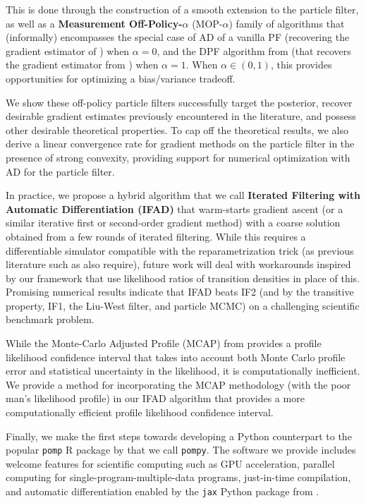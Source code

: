 \documentclass{article}
\begin{document}
This is done through the construction of a smooth extension to the particle filter, as well as a \textbf{Measurement Off-Policy-$\alpha$} (MOP-$\alpha$) family of algorithms that (informally) encompasses the special case of AD of a vanilla PF (recovering the gradient estimator of \citet{blei2018vsmc}) when $\alpha=0$, and the DPF algorithm from \citet{scibior2021dpf} (that recovers the gradient estimator from \citet{poyiadjis11}) when $\alpha=1$. When $\alpha \in (0,1)$, this provides opportunities for optimizing a bias/variance tradeoff. 

We show these off-policy particle filters successfully target the posterior, recover desirable gradient estimates previously encountered in the literature, and possess other desirable theoretical properties. To cap off the theoretical results, we also derive a linear convergence rate for gradient methods on the particle filter in the presence of strong convexity, providing support for numerical optimization with AD for the particle filter. 

In practice, we propose a hybrid algorithm that we call \textbf{Iterated Filtering with Automatic Differentiation (IFAD)} that warm-starts gradient ascent (or a similar iterative first or second-order gradient method) with a coarse solution obtained from a few rounds of iterated filtering. While this requires a differentiable simulator compatible with the reparametrization trick (as previous literature such as \citet{corenflos21} also require), future work will deal with workarounds inspired by our framework that use likelihood ratios of transition densities in place of this. Promising numerical results indicate that IFAD beats IF2 (and by the transitive property, IF1, the Liu-West filter, and particle MCMC) on a challenging scientific benchmark problem.

While the Monte-Carlo Adjusted Profile (MCAP) from \citet{Ionides_mcap} provides a profile likelihood confidence interval that takes into account both Monte Carlo profile error and statistical uncertainty in the likelihood, it is computationally inefficient.  We provide a method for incorporating the MCAP methodology (with the poor man's likelihood profile) in our IFAD algorithm that provides a more computationally efficient profile likelihood confidence interval. 

Finally, we make the first steps towards developing a Python counterpart to the popular \texttt{pomp} R package by \citet{king16, king2017pompmanual} that we call \texttt{pompy}. The software we provide includes welcome features for scientific computing such as GPU acceleration, parallel computing for single-program-multiple-data programs, just-in-time compilation, and automatic differentiation enabled by the \texttt{jax} Python package from \citet{jax2018github}. 
\end{document}
